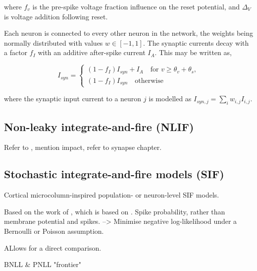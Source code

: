 \documentclass[mphil,deptreport,ianc]{infthesis} %
\begin{document}
where $f_v$ is the pre-spike voltage fraction influence on the reset potential, and $\Delta_V$ is voltage addition following reset.

Each neuron is connected to every other neuron in the network, the weights being normally distributed with values $w \in [-1, 1]$. The synaptic currents decay with a factor $f_I$ with an additive after-spike current $I_A$. This may be written as,

\begin{equation}
    I_{syn} = \begin{cases}
        (1 - f_I) I_{syn} + I_A \quad \text{for } v \geq \theta_v + \theta_s,\\
        (1 - f_I) I_{syn} \quad \text{otherwise}
    \end{cases}
\end{equation}

where the synaptic input current to a neuron $j$ is modelled as $I_{syn,j} = \sum_{i} w_{i,j} I_{i,j}$.

\subsection{Non-leaky integrate-and-fire (NLIF)}

Refer to \cite{Huh2017}, mention impact, refer to synapse chapter.

\subsection{Stochastic integrate-and-fire models (SIF)}
\label{microGIF}

Cortical microcolumn-inspired population- or neuron-level SIF models.

Based on the work of \cite{Rene2020}, which is based on \cite{Schwalger2017}.
Spike probability, rather than membrane potential and spikes.
--> Minimise negative log-likelihood under a Bernoulli or Poisson assumption.

ALlows for a direct comparison.


BNLL \& PNLL "frontier"

\end{document}
